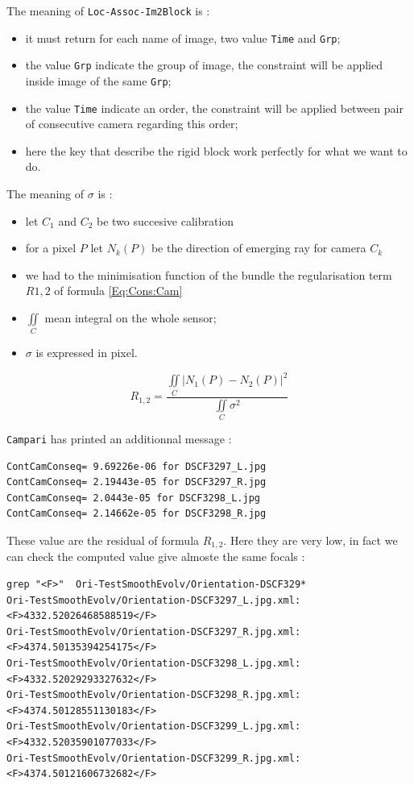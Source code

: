 The meaning of {\tt Loc-Assoc-Im2Block} is :

\begin{itemize}
    \item it must return for each name of image, two value {\tt Time} and {\tt Grp};
    \item the value {\tt Grp} indicate the group of image, the constraint will be applied inside
          image of the same {\tt Grp};
    \item the value {\tt Time} indicate an order, the constraint will be applied between pair of
          consecutive camera regarding this order;
    \item   here the key that describe the rigid block work perfectly for what we want to do.
\end{itemize}

The meaning of $\sigma$ is :

\begin{itemize}
   \item let $C_1$ and $C_2$ be  two succesive calibration
   \item for a pixel $P$ let $N_k(P)$ be the direction of emerging ray for camera $C_k$
   \item we had to the minimisation function of the bundle the regularisation term $R{1,2} $ of formula  \ref{Eq:Cons:Cam}
   \item  $\iint \limits_{C}$ mean integral on the whole sensor;
   \item  $ \sigma$ is expressed in pixel.
\end{itemize}

\begin{equation}
   R_{1,2} = \frac{\iint \limits_{C} |N_1(P)-N_2(P)|^2} {\iint  \limits_{C} \sigma ^2} 
  \label{Eq:Cons:Cam}
\end{equation}

{\tt Campari} has printed an additionnal message :


\begin{verbatim}
ContCamConseq= 9.69226e-06 for DSCF3297_L.jpg
ContCamConseq= 2.19443e-05 for DSCF3297_R.jpg
ContCamConseq= 2.0443e-05 for DSCF3298_L.jpg
ContCamConseq= 2.14662e-05 for DSCF3298_R.jpg
\end{verbatim}

These value are the residual of formula $ R_{1,2}$. Here they are very low,
in fact we can check the computed value give almoste the same focals :

\begin{verbatim}
grep "<F>"  Ori-TestSmoothEvolv/Orientation-DSCF329*
Ori-TestSmoothEvolv/Orientation-DSCF3297_L.jpg.xml:               <F>4332.52026468588519</F>
Ori-TestSmoothEvolv/Orientation-DSCF3297_R.jpg.xml:               <F>4374.50135394254175</F>
Ori-TestSmoothEvolv/Orientation-DSCF3298_L.jpg.xml:               <F>4332.52029293327632</F>
Ori-TestSmoothEvolv/Orientation-DSCF3298_R.jpg.xml:               <F>4374.50128551130183</F>
Ori-TestSmoothEvolv/Orientation-DSCF3299_L.jpg.xml:               <F>4332.52035901077033</F>
Ori-TestSmoothEvolv/Orientation-DSCF3299_R.jpg.xml:               <F>4374.50121606732682</F>
\end{verbatim}






